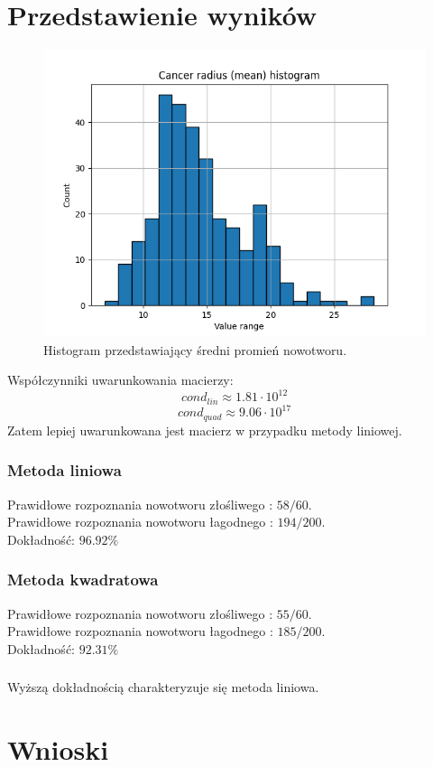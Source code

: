 \documentclass[11pt]{scrartcl}
\begin{document}
    \section{Przedstawienie wyników}
    \begin{figure}[H]
        \centering
        \includegraphics[width=0.8\linewidth]{cancer_radius_hist.png}
        \caption{Histogram przedstawiający średni promień nowotworu.}
    \end{figure}

    Współczynniki uwarunkowania macierzy:
    \[
        cond_{lin} \approx 1.81 \cdot 10^{12}
    \]
    \[
        cond_{quad} \approx 9.06 \cdot 10^{17}
    \]
    Zatem lepiej uwarunkowana jest macierz w przypadku metody liniowej.

    \subsubsection*{Metoda liniowa}
    Prawidłowe rozpoznania nowotworu złośliwego : $58/60$. \\
    Prawidłowe rozpoznania nowotworu łagodnego : $194/200$. \\
    Dokładność: $96.92\%$
    \subsubsection*{Metoda kwadratowa}
    Prawidłowe rozpoznania nowotworu złośliwego : $55/60$. \\
    Prawidłowe rozpoznania nowotworu łagodnego : $185/200$. \\
    Dokładność: $92.31\%$
    \subsubsection*{}
    Wyższą dokładnością charakteryzuje się metoda liniowa.

    \section{Wnioski}
\end{document}
